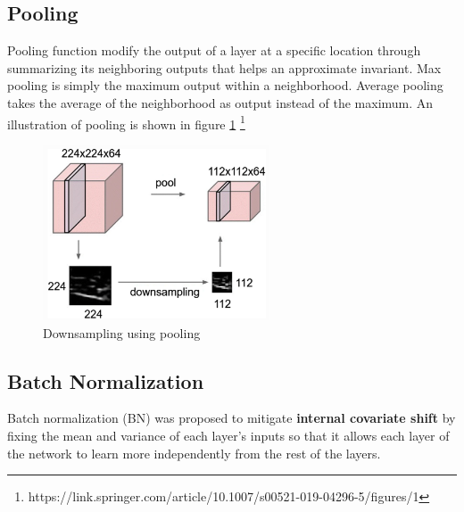 \subsection{Pooling}
Pooling function modify the output of a layer at a specific location through summarizing its neighboring outputs that helps an approximate invariant. Max pooling is simply the maximum output within a neighborhood. Average pooling takes the average of the neighborhood as output instead of the maximum. An illustration of pooling is shown in figure \ref{fig:pooling}
\footnote{https://link.springer.com/article/10.1007/s00521-019-04296-5/figures/1}
\begin{figure}[h]
	\centering
	\includegraphics[width=0.6\textwidth]{img/background_img/pooling_img}
	\caption{Downsampling using pooling}
	\label{fig:pooling}
\end{figure}

\subsection{Batch Normalization}
Batch normalization (BN) was proposed to mitigate \textbf{internal covariate shift} by fixing the mean and variance of each layer's inputs so that it allows each layer of the network to learn more independently from the rest of the layers.\\

